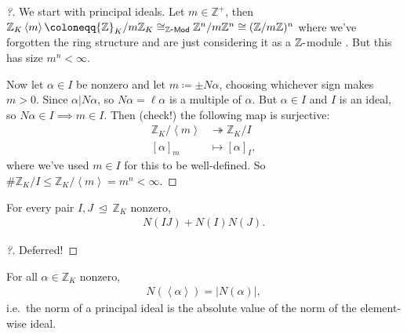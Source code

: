 \begin{proof}[?]

We start with principal ideals. Let \(m\in {\mathbb{Z}}^+\), then
\({\mathbb{Z}}_K \left\langle{ m }\right\rangle \coloneqq{\mathbb{Z}}_K /m {\mathbb{Z}}_K \cong_{{\mathbb{Z}{\hbox{-}}\mathsf{Mod}}} {\mathbb{Z}}^n / m{\mathbb{Z}}^n \cong ({\mathbb{Z}}/m{\mathbb{Z}})^n\)
where we've forgotten the ring structure and are just considering it as
a \({\mathbb{Z}}{\hbox{-}}\)module . But this has size \(m^n < \infty\).

Now let \(\alpha\in I\) be nonzero and let \(m \coloneqq\pm N \alpha\),
choosing whichever sign makes \(m>0\). Since
\(\alpha\mathrel{\Big|}N \alpha\), so \(N \alpha = \ell \alpha\) is a
multiple of \(\alpha\). But \(\alpha\in I\) and \(I\) is an ideal, so
\(N \alpha\in I \implies m \in I\). Then (check!) the following map is
surjective:
\begin{align*}
{\mathbb{Z}}_K/ \left\langle{ m }\right\rangle &\twoheadrightarrow{\mathbb{Z}}_K/I \\
[ \alpha]_m &\mapsto [ \alpha]_I
,\end{align*}
where we've used \(m\in I\) for this to be well-defined. So
\(\# {\mathbb{Z}}_K /I \leq {\mathbb{Z}}_K / \left\langle{ m }\right\rangle = m^n < \infty\).

\end{proof}

\begin{theorem}

For every pair \(I, J{~\trianglelefteq~}{\mathbb{Z}}_K\) nonzero,
\begin{align*}
N( IJ) + N(I) N(J)
.\end{align*}

\end{theorem}

\begin{proof}[?]

Deferred!

\end{proof}

\begin{theorem}

For all \(\alpha\in {\mathbb{Z}}_K\) nonzero,
\begin{align*}
N( \left\langle{ \alpha }\right\rangle) = {\left\lvert { N ( \alpha ) } \right\rvert}
,\end{align*}
i.e.~the norm of a principal ideal is the absolute value of the norm of
the element-wise ideal.

\end{theorem}

